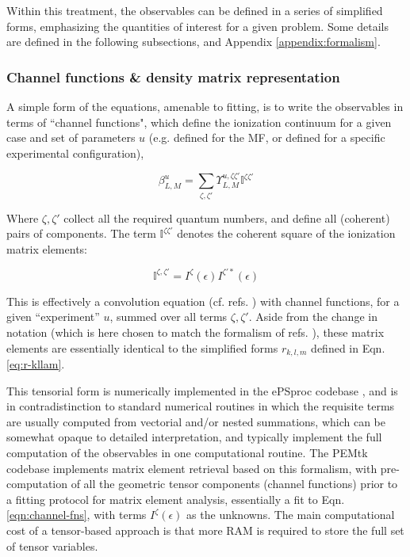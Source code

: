 Within this treatment, the observables can be defined in a series of simplified forms, emphasizing the quantities of interest for a given problem. Some details are defined in the following subsections, and Appendix \ref{appendix:formalism}.

\subsubsection{Channel functions \& density matrix representation}

A simple form of the equations, amenable to fitting, is to write the observables in terms of ``channel functions", which define the ionization continuum for a given case and set of parameters $u$ (e.g. defined for the MF, or defined for a specific experimental configuration),

\begin{equation}
\beta_{L,M}^{u}=\sum_{\zeta,\zeta'}\varUpsilon_{L,M}^{u,\zeta\zeta'}\mathbb{I}^{\zeta\zeta'}\label{eqn:channel-fns}
\end{equation}


Where $\zeta,\zeta'$ collect all the required quantum numbers, and define all (coherent) pairs of components. The term $\mathbb{I}^{\zeta\zeta'}$ denotes the coherent square of the ionization matrix elements:

\begin{equation}
\mathbb{I}^{\zeta,\zeta'}=I^{\zeta}(\epsilon)I^{\zeta'*}(\epsilon)
\end{equation}

This is effectively a convolution equation (cf. refs. \cite{Reid2000,gregory2021MolecularFramePhotoelectron}) with channel functions, for a given ``experiment'' $u$, summed over all terms $\zeta,\zeta'$. Aside from the change in notation (which is here chosen to match the formalism of refs. \cite{Gianturco1994, Lucchese1986, Natalense1999}), these matrix elements are essentially identical to the simplified forms $r_{k,l,m}$ defined in Eqn. \ref{eq:r-kllam}.

This tensorial form is numerically implemented in the ePSproc codebase \cite{ePSprocGithub}, and is in contradistinction to standard numerical routines in which the requisite terms are usually computed from vectorial and/or nested summations, which can be somewhat opaque to detailed interpretation, and typically implement the full computation of the observables in one computational routine. The PEMtk codebase \cite{hockett2021PhotoelectronMetrologyToolkit} implements matrix element retrieval based on this formalism, with pre-computation of all the geometric tensor components (channel functions) prior to a fitting protocol for matrix element analysis, essentially a fit to Eqn. \ref{eqn:channel-fns}, with terms $I^{\zeta}(\epsilon)$ as the unknowns. The main computational cost of a tensor-based approach is that more RAM is required to store the full set of tensor variables.

